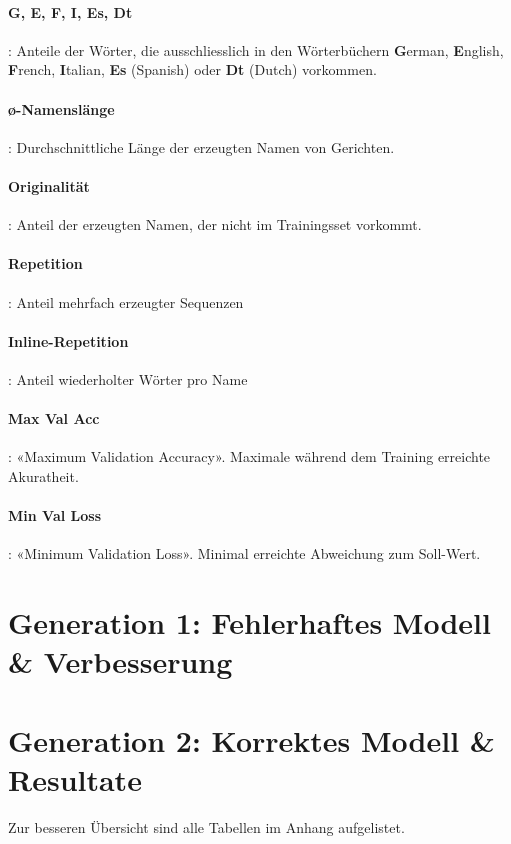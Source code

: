 \paragraph{G, E, F, I, Es, Dt}: Anteile der Wörter, die ausschliesslich in den Wörterbüchern \textbf{G}erman, \textbf{E}nglish, \textbf{F}rench, \textbf{I}talian, \textbf{Es} (Spanish) oder \textbf{Dt} (Dutch) vorkommen.
\paragraph{ø-Namenslänge}: Durchschnittliche Länge der erzeugten Namen von Gerichten.
\paragraph{Originalität}: Anteil der erzeugten Namen, der nicht im Trainingsset vorkommt.
\paragraph{Repetition}: Anteil mehrfach erzeugter Sequenzen
\paragraph{Inline-Repetition}: Anteil wiederholter Wörter pro Name
\paragraph{Max Val Acc}: «Maximum Validation Accuracy».
Maximale während dem Training erreichte Akuratheit.
\paragraph{Min Val Loss}: «Minimum Validation Loss».
Minimal erreichte Abweichung zum Soll-Wert.

\section{Generation 1: Fehlerhaftes Modell \& Verbesserung}
\label{sec:erroneous-model}



\section{Generation 2: Korrektes Modell \& Resultate}
\label{sec:correct-model}

Zur besseren Übersicht sind alle Tabellen im Anhang aufgelistet.


